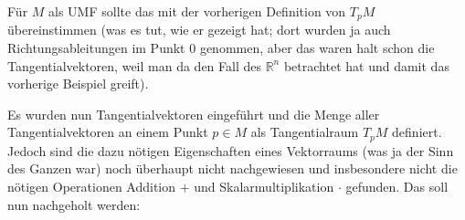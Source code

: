 \documentclass[../H_Analysis_main.tex]{subfiles}
\begin{document}
\begin{bsp}
Für $M$ als UMF sollte das mit der vorherigen Definition von $T_p M$ übereinstimmen (was es tut, wie er gezeigt hat; dort wurden ja auch Richtungsableitungen im Punkt 0 genommen, aber das waren halt schon die Tangentialvektoren, weil man da den Fall des $\mathbb{R}^n$ betrachtet hat und damit das vorherige Beispiel greift).
\end{bsp}


Es wurden nun Tangentialvektoren eingeführt und die Menge aller Tangentialvektoren an einem Punkt $p \in M$ als Tangentialraum $T_p M$ definiert. Jedoch sind die dazu nötigen Eigenschaften eines Vektorraums (was ja der Sinn des Ganzen war) noch überhaupt nicht nachgewiesen und insbesondere nicht die nötigen Operationen Addition $+$ und Skalarmultiplikation $\cdot$ gefunden. Das soll nun nachgeholt werden:
\end{document}
